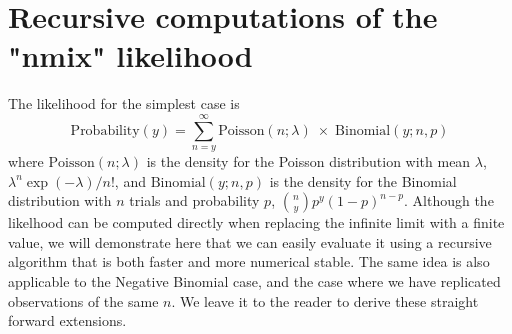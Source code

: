 \documentclass[article]{jss}
\begin{document}
\appendix
\section{Recursive computations of the "nmix" likelihood}
The likelihood for the simplest case is
\begin{displaymath}
    \text{Probability}(y) = \sum_{n = y}^{\infty}
    \text{Poisson}(n ; \lambda) \;\times\; \text{Binomial}(y;  n, p)
\end{displaymath}
where $\text{Poisson}(n; \lambda)$ is the density for the Poisson distribution with mean $\lambda$, $\lambda^{n}\exp(-\lambda)/n!$, and $\text{Binomial}(y; n, p)$ is the density for the Binomial distribution with $n$ trials and probability $p$, ${n \choose y} p^{y}(1-p)^{n-p}$. Although the likelhood can be computed directly when replacing the infinite limit with a finite value, we will demonstrate here that we can easily evaluate it using a recursive algorithm that is both faster and more numerical stable. The same idea is also applicable to the Negative Binomial case, and the case where we have replicated observations of the same $n$. We leave it to the reader to derive these straight forward extensions.
\end{document}
